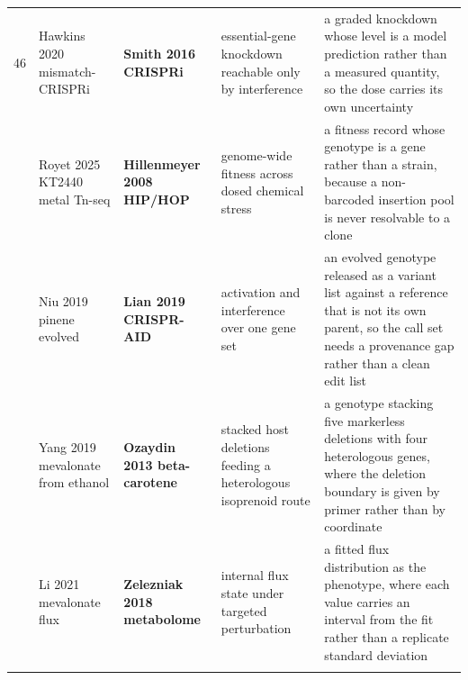 \begin{landscape}
\begin{longtable}{@{}r@{\hspace{4pt}} L{40mm} L{40mm} L{74mm} L{74mm}@{}}
46 & Hawkins 2020 mismatch-CRISPRi  & \textbf{Smith 2016 CRISPRi} & essential-gene knockdown reachable only by interference & a graded knockdown whose level is a model prediction rather than a measured quantity, so the dose carries its own uncertainty \\
 & Royet 2025 KT2440 metal Tn-seq  & \textbf{Hillenmeyer 2008 HIP/HOP} & genome-wide fitness across dosed chemical stress & a fitness record whose genotype is a gene rather than a strain, because a non-barcoded insertion pool is never resolvable to a clone \\
 & Niu 2019 pinene evolved  & \textbf{Lian 2019 CRISPR-AID} & activation and interference over one gene set & an evolved genotype released as a variant list against a reference that is not its own parent, so the call set needs a provenance gap rather than a clean edit list \\
 & Yang 2019 mevalonate from ethanol  & \textbf{Ozaydin 2013 beta-carotene} & stacked host deletions feeding a heterologous isoprenoid route & a genotype stacking five markerless deletions with four heterologous genes, where the deletion boundary is given by primer rather than by coordinate \\
 & Li 2021 mevalonate flux  & \textbf{Zelezniak 2018 metabolome} & internal flux state under targeted perturbation & a fitted flux distribution as the phenotype, where each value carries an interval from the fit rather than a replicate standard deviation \\
\addlinespace[5pt]
\end{longtable}
\endgroup
\end{landscape}
